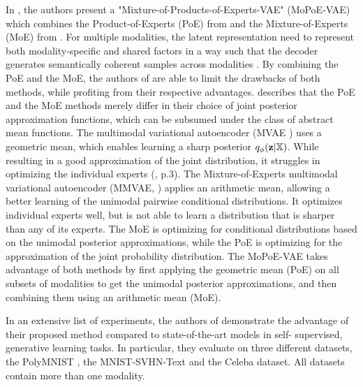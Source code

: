	In \cite{thomas_gener-ELBO}, the authors present a "Mixture-of-Products-of-Experts-VAE" (MoPoE-VAE) which combines the Product-of-Experts (PoE) from \cite{wu2018multimodal} and the Mixture-of-Experts (MoE) from \cite{shi2019variational}.
	For multiple modalities, the latent representation need to represent both modality-specific and shared factors in a way such that the decoder generates semantically coherent samples across modalities \cite{shi2019variational}.
	By combining the PoE and the MoE, the authors of \cite{thomas_gener-ELBO} are able to limit the drawbacks of both methods, while profiting from their respective advantages.
	\cite{thomas_gener-ELBO} describes that the PoE and the MoE methods merely differ in their choice of joint posterior approximation functions, which can be subsumed under the class of abstract mean functions.
	The multimodal variational autoencoder (MVAE \cite{wu2018multimodal}) uses a geometric mean, which enables learning a sharp posterior $q_{\phi}(\textbf{z}|\mathbb{X})$.
	While resulting in a good approximation of the joint distribution, it struggles in optimizing the individual experts (\cite{wu2018multimodal}, p.3).
	The Mixture-of-Experts multimodal variational autoencoder (MMVAE, \cite{shi2019variational}) applies an arithmetic mean, allowing a better learning of the unimodal pairwise conditional distributions.
	It optimizes individual experts well, but is not able to learn a distribution that is sharper than any of its experts.
	The MoE is optimizing for conditional distributions based on the unimodal posterior approximations, while the PoE is optimizing for the approximation of the joint probability distribution.
	The MoPoE-VAE takes advantage of both methods by first applying the geometric mean (PoE) on all subsets of modalities to get the unimodal posterior approximations, and then combining them using an arithmetic mean (MoE).

	In an extensive list of experiments, the authors of \cite{thomas_gener-ELBO} demonstrate the advantage of their proposed method compared to state-of-the-art models in self- supervised, generative learning tasks.
	In particular, they evaluate on three different datasets, the PolyMNIST \cite{thomas_gener-ELBO}, the MNIST-SVHN-Text \cite{thomas_multimodal} and the Celeba dataset.
	All datasets contain more than one modality.




